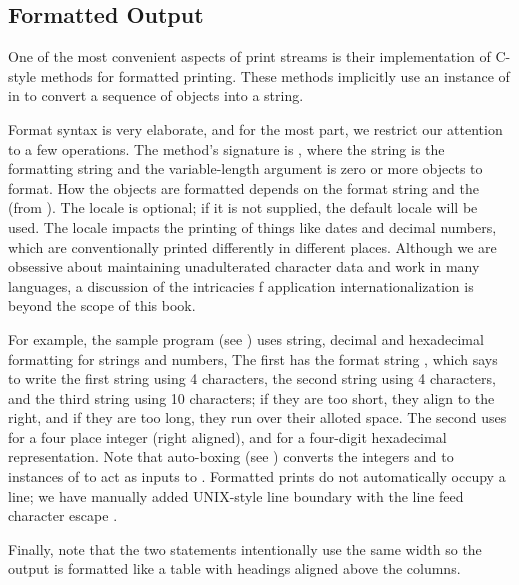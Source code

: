 \subsection{Formatted Output}

One of the most convenient aspects of print streams is their
implementation of C-style  methods for formatted
printing.  These methods implicitly use an instance of
 in  to convert a sequence of objects
into a string.  

Format syntax is very elaborate, and for the most part, we restrict
our attention to a few operations.  The method's signature is
, where the string is the
formatting string and the variable-length argument 
is zero or more objects to format.  How the objects are formatted
depends on the format string and the  (from
).  The locale is optional; if it is not supplied, the
default locale will be used.  The locale impacts the printing of
things like dates and decimal numbers, which are conventionally
printed differently in different places.  Although we are obsessive
about maintaining unadulterated character data and work in many
languages, a discussion of the intricacies f application
internationalization is beyond the scope of this book.

For example, the sample program  (see
) uses string, decimal and hexadecimal
formatting for strings and numbers,
%
%
The first  has the format string
, which says to write the first string
using 4 characters, the second string using 4 characters, and the
third string using 10 characters; if they are too short, they align to
the right, and if they are too long, they run over their alloted
space.  The second  uses  for a four place
integer (right aligned), and  for a four-digit hexadecimal
representation.  Note that auto-boxing (see )
converts the integers  and  to instances of
 to act as inputs to .  Formatted prints
do not automatically occupy a line; we have manually added UNIX-style
line boundary with the line feed character escape .

Finally, note that the two  statements
intentionally use the same width so the output is formatted like a table
with headings aligned above the columns.  


